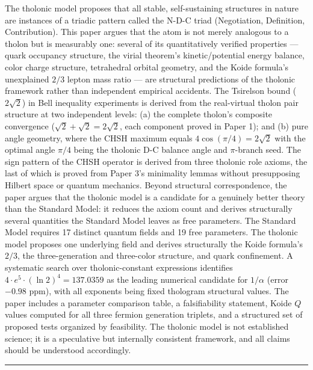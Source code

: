 \documentclass[
  11pt,
  letterpaper,
]{article}
\begin{document}
The tholonic model proposes that all stable, self-sustaining structures
in nature are instances of a triadic pattern called the N-D-C triad
(Negotiation, Definition, Contribution). This paper argues that the atom
is not merely analogous to a tholon but is measurably one: several of
its quantitatively verified properties --- quark occupancy structure,
the virial theorem's kinetic/potential energy balance, color charge
structure, tetrahedral orbital geometry, and the Koide formula's
unexplained \(2/3\) lepton mass ratio --- are structural predictions of
the tholonic framework rather than independent empirical accidents. The
Tsirelson bound (\(2\sqrt{2}\)) in Bell inequality experiments is
derived from the real-virtual tholon pair structure at two independent
levels: (a) the complete tholon's composite convergence
(\(\sqrt{2} + \sqrt{2} = 2\sqrt{2}\), each component proved in Paper 1);
and (b) pure angle geometry, where the CHSH maximum equals
\(4\cos(\pi/4) = 2\sqrt{2}\) with the optimal angle \(\pi/4\) being the
tholonic D-C balance angle and \(\pi\)-branch seed. The sign pattern of
the CHSH operator is derived from three tholonic role axioms, the last
of which is proved from Paper 3's minimality lemmas without presupposing
Hilbert space or quantum mechanics. Beyond structural correspondence,
the paper argues that the tholonic model is a candidate for a genuinely
better theory than the Standard Model: it reduces the axiom count and
derives structurally several quantities the Standard Model leaves as
free parameters. The Standard Model requires 17 distinct quantum fields
and 19 free parameters. The tholonic model proposes one underlying field
and derives structurally the Koide formula's \(2/3\), the
three-generation and three-color structure, and quark confinement. A
systematic search over tholonic-constant expressions identifies
\(4 \cdot e^5 \cdot (\ln 2)^4 = 137.0359\) as the leading numerical
candidate for \(1/\alpha\) (error \(-0.98\) ppm), with all exponents
being fixed thologram structural values. The paper includes a parameter
comparison table, a falsifiability statement, Koide \(Q\) values
computed for all three fermion generation triplets, and a structured set
of proposed tests organized by feasibility. The tholonic model is not
established science; it is a speculative but internally consistent
framework, and all claims should be understood accordingly.

\begin{center}\rule{0.5\linewidth}{0.5pt}\end{center}
\end{document}
